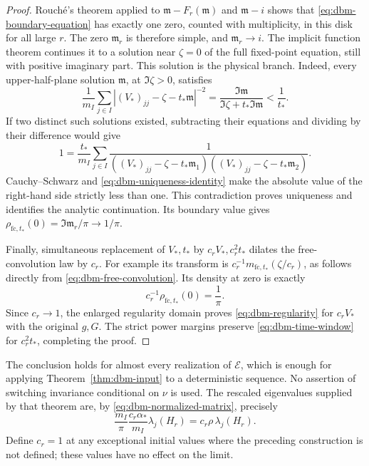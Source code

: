 \begin{proof}
Rouch\'e's theorem applied to \(\mathfrak m-F_r(\mathfrak m)\) and \(\mathfrak m-i\) shows that
\eqref{eq:dbm-boundary-equation} has exactly one zero, counted with
multiplicity, in this disk for all large \(r\). The zero \(\mathfrak m_r\) is
therefore simple, and \(\mathfrak m_r\to i\).
The implicit function theorem continues it to a solution near
\(\zeta=0\) of the full fixed-point equation, still with positive
imaginary part. This solution is the physical branch. Indeed, every
upper-half-plane solution \(\mathfrak m\), at \(\Im\zeta>0\), satisfies
\begin{equation}
 \label{eq:dbm-uniqueness-identity}
 \frac1{m_I}\sum_{j\in I}
   |(V_*)_{jj}-\zeta-t_*\mathfrak m|^{-2}
       =\frac{\Im \mathfrak m}{\Im\zeta+t_*\Im \mathfrak m}<\frac1{t_*}.
\end{equation}
If two distinct such solutions existed, subtracting their equations
and dividing by their difference would give
\[
 1=\frac{t_*}{m_I}\sum_{j\in I}
  \frac1{((V_*)_{jj}-\zeta-t_*\mathfrak m_1)
          ((V_*)_{jj}-\zeta-t_*\mathfrak m_2)}.
\]
Cauchy--Schwarz and \eqref{eq:dbm-uniqueness-identity} make the
absolute value of the right-hand side strictly less than one.
This contradiction proves uniqueness and identifies the analytic
continuation. Its boundary value gives
\(\rho_{\mathrm{fc},t_*}(0)=\Im \mathfrak m_r/\pi\to1/\pi\).

Finally, simultaneous replacement of \(V_*,t_*\) by
\(c_rV_*,c_r^2t_*\) dilates the free-convolution law by \(c_r\).
For example its transform is
\(c_r^{-1}m_{\mathrm{fc},t_*}(\zeta/c_r)\), as follows directly
from \eqref{eq:dbm-free-convolution}. Its density at zero is exactly
\[
 c_r^{-1}\rho_{\mathrm{fc},t_*}(0)=\frac1\pi.
\]
Since \(c_r\to1\), the enlarged regularity domain proves
\eqref{eq:dbm-regularity} for \(c_rV_*\) with the original \(g,G\).
The strict power margins preserve \eqref{eq:dbm-time-window} for
\(c_r^2t_*\), completing the proof.
\end{proof}

The conclusion holds for almost every realization of \(\mathcal E\), which is
enough for applying Theorem~\ref{thm:dbm-input} to a deterministic
sequence. No assertion of switching invariance conditional on \(\nu\)
is used. The rescaled eigenvalues supplied by that theorem are, by
\eqref{eq:dbm-normalized-matrix}, precisely
\begin{equation}
 \label{eq:dbm-final-coordinates}
 \frac{m_I}{\pi}\frac{c_r\alpha_*}{m_I}
       \lambda_j(H_r)
       =c_r\rho\,\lambda_j(H_r).
\end{equation}
Define \(c_r=1\) at any exceptional initial values where the preceding
construction is not defined; these values have no effect on the limit.

